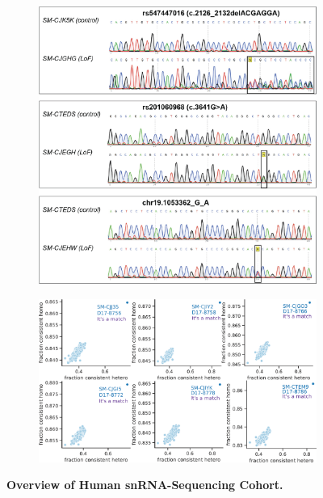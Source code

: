 \begin{figure}[H]
\begin{subfigure}[t]{\textwidth}
    \end{subfigure}  
    \begin{subfigure}[t]{.5\textwidth}
        \caption{}
        \includegraphics[width=\textwidth]{./extended_plots/sanger_seq.png}        
    \end{subfigure}  
    \begin{subfigure}[t]{0.5\textwidth}
        \caption{}
        \includegraphics[width=\textwidth]{./extended_plots/sample_swap.png}        
    \end{subfigure}  
    \caption{
        \textbf{Overview of Human snRNA-Sequencing Cohort.}\\
    }
    \label{fig:snRNA_cohort}
\end{figure}
